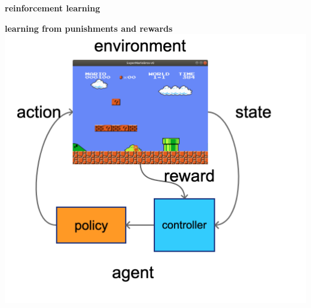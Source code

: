 \documentclass[xcolor=dvipsnames]{beamer}
\begin{document}
\begin{frame}{\bf reinforcement learning}

  {\bf learning from punishments and rewards \\}
  {\centering \includegraphics[scale=0.2]{../diagrams/basic/reinforcementlearning.png}}

\end{frame}
\end{document}
